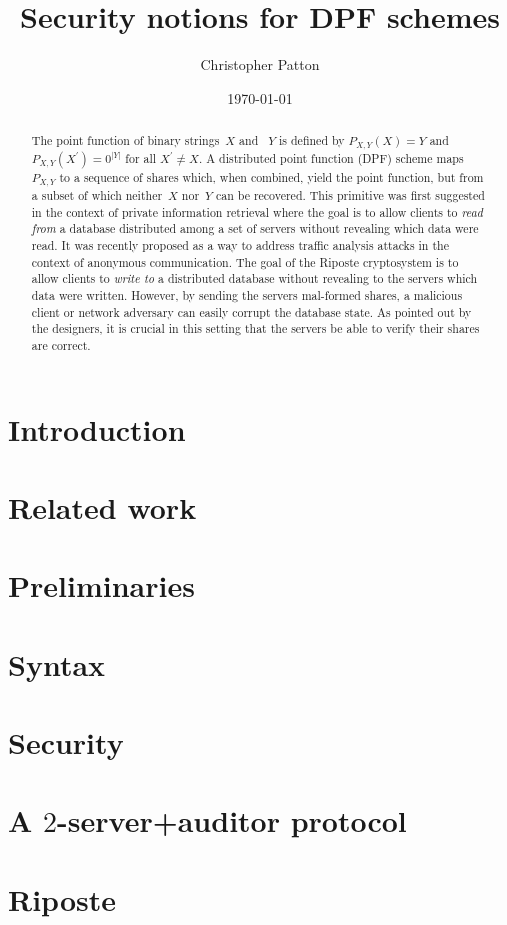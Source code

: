 \documentclass{llncs}
\date{\today}
\title{\textbf{Security notions for DPF schemes}}
\author{Christopher Patton}
\institute{University of Florida}
\begin{document}
\maketitle

\begin{abstract}
  The point function of binary strings~$X$ and~ $Y$ is defined by $P_{X,Y}(X) =
  Y$ and $P_{X,Y}(X^\prime) = 0^{|Y|}$ for all $X^\prime \ne X$. A distributed
  point function (DPF) scheme maps~$P_{X,Y}$ to a sequence of shares which, when
  combined, yield the point function, but from a subset of which neither~$X$
  nor~$Y$ can be recovered. This primitive was first suggested in the context of
  private information retrieval where the goal is to allow clients to \emph{read
  from} a database distributed among a set of servers without revealing which
  data were read. It was recently proposed as a way to address traffic analysis
  attacks in the context of anonymous communication.
  The goal of the Riposte cryptosystem \cite{riposte} is to allow clients to
  \emph{write to} a distributed database without revealing to the servers which
  data were written. However, by sending the servers mal-formed shares, a
  malicious client or network adversary can easily corrupt the database state.
  As pointed out by the designers, it is crucial in this setting that the
  servers be able to verify their shares are correct.
\end{abstract}

\section{Introduction}


\section{Related work}


\section{Preliminaries}


\section{Syntax}


\section{Security}


\section{A $2$-server+auditor protocol}


\section{Riposte}

\fi



\end{document}
